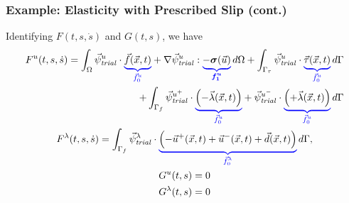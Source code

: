 \documentclass[aspectratio=169]{beamer}
\begin{document}
\begin{frame}
  \frametitle{Example: Elasticity with Prescribed Slip (cont.)}
  \summary{}

Identifying $F(t,s,\dot{s})$ and $G(t,s)$, we have
\begin{gather}
  \begin{split}
F^u(t,s,\dot{s}) = \int_\Omega \trialvec[u] \cdot \eqnannotate{\vec{f}(\vec{x},t)}{\vec{f}^u_0} + \nabla \trialvec[u] : \eqnannotate{-\tensor{\sigma}(\vec{u})}{\tensor{f^u_1}} \, d\Omega
  + \int_{\Gamma_\tau} \trialvec[u] \cdot \eqnannotate{\vec{\tau}(\vec{x},t)}{\vec{f}^u_0} \, d\Gamma\\ 
  + \int_{\Gamma_{f}} \trialvec[u^+] \cdot \eqnannotate{\left(-\vec{\lambda}(\vec{x},t)\right)}{\vec{f}^u_0}
  + \trialvec[u^-] \cdot \eqnannotate{\left(+\vec{\lambda}(\vec{x},t)\right)}{\vec{f}^u_0}\, d\Gamma
  \end{split}\\
  F^\lambda(t,s,\dot{s}) = \int_{\Gamma_{f}} \trialvec[\lambda] \cdot \eqnannotate{\left(
    -\vec{u}^+(\vec{x},t) + \vec{u}^-(\vec{x},t) + \vec{d}(\vec{x},t) \right)}{\vec{f}^\lambda_0} \, d\Gamma, \\
  G^u(t,s) = 0 \\
  G^\lambda(t,s) = 0
\end{gather}

\end{frame}
\end{document}
